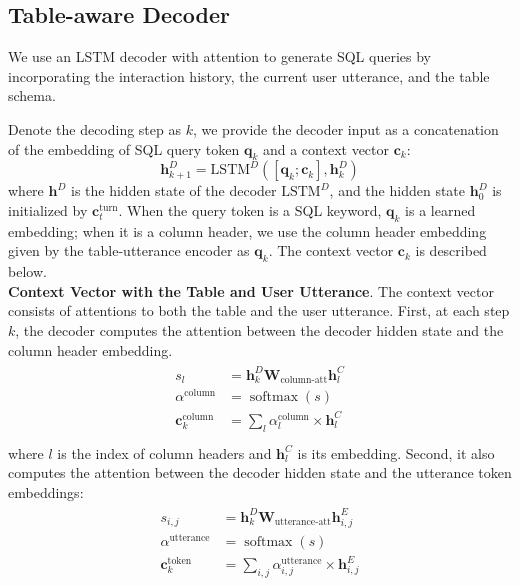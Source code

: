 \documentclass[11pt,a4paper]{article}
\newcommand{\newvec}[1]{\mathbf{#1}}
\DeclareMathOperator*{\softmax}{softmax}
\begin{document}
\subsection{Table-aware Decoder}
\label{sec:table-aware-decoder}
We use an LSTM decoder with attention to generate SQL queries by incorporating the interaction history, the current user utterance, and the table schema.

Denote the decoding step as $k$, we provide the decoder input as a concatenation of the embedding of SQL query token $\newvec{q}_k$ and a context vector $\newvec{c}_k$:
\begin{equation*}
    \newvec{h}^{D}_{k+1} = \text{LSTM}^{D}([\newvec{q}_k;\newvec{c}_k], \newvec{h}^{D}_{k})
\end{equation*}
where $\newvec{h}^{D}$ is the hidden state of the decoder $\text{LSTM}^{D}$, and the hidden state $\newvec{h}^{D}_{0}$ is initialized by $\newvec{c}_{t}^{\text{turn}}$.
When the query token is a SQL keyword, $\newvec{q}_k$ is a learned embedding; when it is a column header, we use the column header embedding given by the table-utterance encoder as $\newvec{q}_k$.
The context vector $\newvec{c}_k$ is described below.
\\\noindent
\textbf{Context Vector with the Table and User Utterance}. 
The context vector consists of attentions to both the table and the user utterance.
First, at each step $k$, the decoder computes the attention between the decoder hidden state and the column header embedding.
\begin{align}
\label{eq:att1}
\begin{split}
s_{l}                         & = \newvec{h}^{D}_{k}\newvec{W}_{\text{column-att}}\newvec{h}^{C}_{l} \\
\alpha^{\text{column}}        & = \softmax(s)  \\
\newvec{c}_k^{\text{column}}  & = \sum_{l} \alpha_{l}^{\text{column}} \times \newvec{h}^{C}_{l} \\
\end{split}
\end{align}
where $l$ is the index of column headers and $\newvec{h}^{C}_{l}$ is its embedding.
Second, it also computes the attention between the decoder hidden state and the utterance token embeddings:
\begin{align}
\label{eq:att2}
\begin{split}
s_{i,j}                        & = \newvec{h}^{D}_{k}\newvec{W}_{\text{utterance-att}}\newvec{h}^{E}_{i,j} \\
\alpha^{\text{utterance}}      & = \softmax(s)  \\
\newvec{c}_k^{\text{token}}    & = \sum_{i,j} \alpha_{i,j}^{\text{utterance}} \times \newvec{h}^{E}_{i,j} \\
\end{split}
\end{align}
\end{document}
